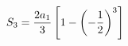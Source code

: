 \documentclass[preview]{standalone}
\begin{document}
\begin{align*}
\special{dvisvgm:raw <g id='unique000'>}S_3=\frac{2a_1}{3}\left[1-\left(-\frac{1}{2}\right)^3\right]\special{dvisvgm:raw </g>}
\end{align*}
\end{document}
